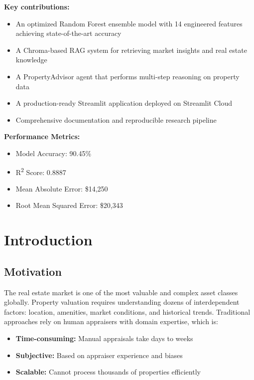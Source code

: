 \documentclass[11pt,a4paper]{article}
\begin{document}
\textbf{Key contributions:}
\begin{itemize}
    \item An optimized Random Forest ensemble model with 14 engineered features achieving state-of-the-art accuracy
    \item A Chroma-based RAG system for retrieving market insights and real estate knowledge
    \item A PropertyAdvisor agent that performs multi-step reasoning on property data
    \item A production-ready Streamlit application deployed on Streamlit Cloud
    \item Comprehensive documentation and reproducible research pipeline
\end{itemize}

\textbf{Performance Metrics:}
\begin{itemize}
    \item Model Accuracy: 90.45\%
    \item R\textsuperscript{2} Score: 0.8887
    \item Mean Absolute Error: \$14,250
    \item Root Mean Squared Error: \$20,343
\end{itemize}

\pagebreak

\section{Introduction}

\subsection{Motivation}

The real estate market is one of the most valuable and complex asset classes globally. Property valuation requires understanding dozens of interdependent factors: location, amenities, market conditions, and historical trends. Traditional approaches rely on human appraisers with domain expertise, which is:
\begin{itemize}
    \item \textbf{Time-consuming:} Manual appraisals take days to weeks
    \item \textbf{Subjective:} Based on appraiser experience and biases
    \item \textbf{Scalable:} Cannot process thousands of properties efficiently
\end{itemize}
\end{document}
